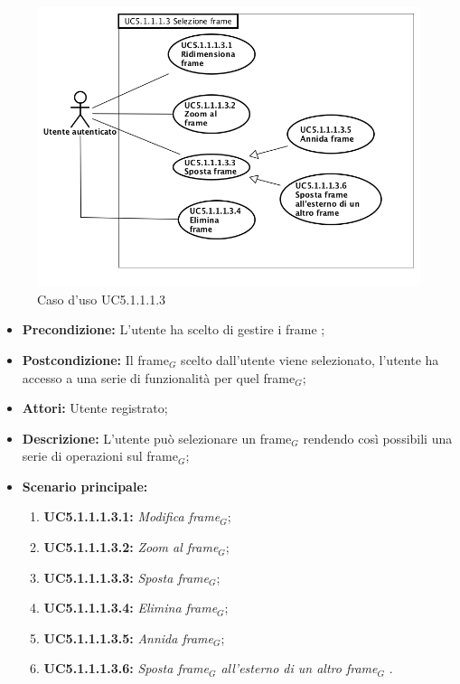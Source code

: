 \begin{figure}[h]
	\begin{center}
	\includegraphics[scale=0.5]{diagram/UC5-1-1-1-3.png}
	\caption{Caso d'uso UC5.1.1.1.3}
	\end{center}
\end{figure}
\begin{itemize}
	\item \textbf{Precondizione:} L'utente ha scelto di gestire i frame ;
	\item \textbf{Postcondizione:} Il frame$_G$ scelto dall'utente viene selezionato, l'utente ha accesso a una serie di funzionalità per quel frame$_G$;
	\item \textbf{Attori:} Utente registrato;
	\item \textbf{Descrizione:} L'utente può selezionare un frame$_G$ rendendo così possibili una serie di operazioni sul frame$_G$;
	\item \textbf{Scenario principale:}
	\begin{enumerate}
		\item \textbf{ UC5.1.1.1.3.1:} \textit{ Modifica frame$_G$};
		\item \textbf{ UC5.1.1.1.3.2:} \textit{ Zoom al frame$_G$};
		\item \textbf{ UC5.1.1.1.3.3:} \textit{ Sposta frame$_G$};
		\item \textbf{ UC5.1.1.1.3.4:} \textit{ Elimina frame$_G$};
		\item \textbf{ UC5.1.1.1.3.5:} \textit{ Annida frame$_G$};
		\item \textbf{ UC5.1.1.1.3.6:} \textit{ Sposta frame$_G$ all'esterno di un altro frame$_G$  }.
	\end{enumerate}
\end{itemize}
